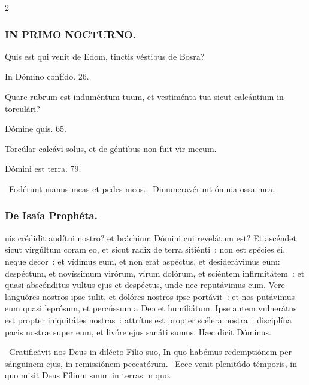 \documentclass[9pt,twoside]{extarticle}
\begin{document}
\begin{multicols}{2}
\subsubsection*{\center \textsc{IN PRIMO NOCTURNO.}}
\begin{tightlist}{}
\item {} Quis est qui venit de Edom, tinctis véstibus de Bosra?
\item {} In Dómino confído. 26.
\item {} Quare rubrum est induméntum tuum, et vestiménta tua sicut calcántium in torculári?
\item {} Dómine quis. 65.
\item {} Torcúlar calcávi solus, et de géntibus non fuit vir mecum.
\item {} Dómini est terra. 79.
\item {}~Fodérunt manus meas et pedes meos. ~Dinumeravérunt ómnia ossa mea.
\end{tightlist}

\subsubsection*{\center De Isaía Prophéta.}
\begin{center}\end{center}
uis crédidit audítui nostro? et bráchium Dómini cui revelátum est?
Et ascéndet sicut virgúltum coram eo, et sicut radix de terra sitiénti~: non est spécies ei, neque decor~: et vídimus eum, et non erat aspéctus, et desiderávimus eum:
despéctum, et novíssimum virórum, virum dolórum, et sciéntem infirmitátem~: et quasi abscónditus vultus ejus et despéctus, unde nec reputávimus eum.
Vere languóres nostros ipse tulit, et dolóres nostros ipse portávit~: et nos putávimus eum quasi leprósum, et percússum a Deo et humiliátum.
Ipse autem vulnerátus est propter iniquitátes nostras~: attrítus est propter scélera nostra~: disciplína pacis nostræ super eum, et livóre ejus sanáti sumus. Hæc dicit Dóminus.

\begin{tightlist}{}
\item {}~Gratificávit nos Deus in dilécto Fílio suo, \textred{*} In quo habémus redemptiónem per sánguinem ejus, in remissiónem peccatórum. ~Ecce venit plenitúdo témporis, in quo misit Deus Fílium suum in terras. n quo.
\end{tightlist}


\end{multicols}
\end{document}
